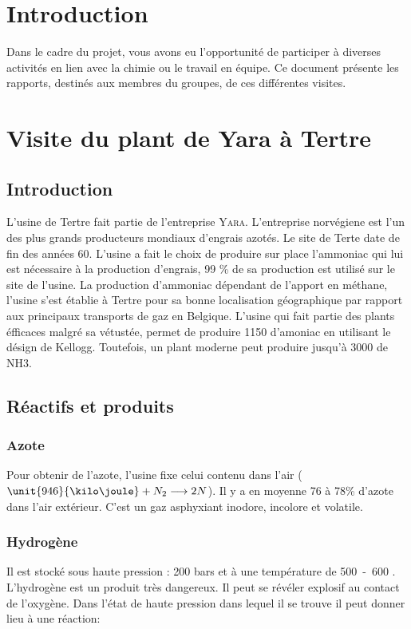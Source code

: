 

\section{Introduction}
Dans le cadre du projet, vous avons eu l'opportunité de
participer à diverses activités en lien avec la chimie ou
le travail en équipe. Ce document présente les rapports,
destinés aux membres du groupes, de ces différentes visites.

\section{Visite du plant de Yara à Tertre}

\subsection{Introduction}
L’usine de Tertre fait partie de l’entreprise \textsc{Yara}. L’entreprise norvégiene est l’un des plus grands producteurs
mondiaux d’engrais azotés. Le site de Terte date de fin des années 60. L’usine a fait le choix de produire sur place 
l’ammoniac qui lui est nécessaire à la production d’engrais, 99 \%  de sa production est utilisé sur le site de l’usine. 
La production d’ammoniac dépendant de l’apport en méthane, l’usine s’est établie à Tertre pour sa bonne localisation 
géographique par rapport aux principaux transports de gaz en Belgique. L'usine qui fait partie des plants éfficaces malgré 
sa vétustée, permet de produire \unit{1150}{\ton\per\dday} d’amoniac en utilisant le désign de Kellogg. 
Toutefois, un plant moderne peut produire jusqu’à \unit{3000}{\ton\per\dday} de NH3.

\subsection{Réactifs et produits}

\subsubsection{Azote}

Pour obtenir de l’azote, l’usine fixe celui contenu dans l’air ($\unit{946}{\kilo\joule} + N_2 \longrightarrow 2N$). 
Il y a en moyenne 76 à 78\% d’azote dans l’air extérieur. C’est un gaz asphyxiant inodore, incolore et volatile. 

\subsubsection{Hydrogène}
Il est stocké sous haute pression : 200 bars et à une température de \unit{500-600} {\degreeCelsius}.
L’hydrogène est un produit très dangereux. Il peut se révéler explosif au contact de l’oxygène. Dans l’état de haute 
pression dans lequel il se trouve il peut donner lieu à une réaction: 

